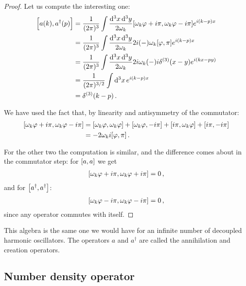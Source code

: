 \documentclass[main.tex]{subfiles}
\begin{document}
\begin{proof}
Let us compute the interesting one: 
%
\begin{align}
\qty[a(k), a ^\dag (p)] &= \frac{1}{(2\pi )^3} \int \frac{ \dd[3]{x} \dd[3]{y}}{2 \omega_{k}}
\qty[\omega_{k} \varphi + i \pi, \omega_{k} \varphi - i \pi ] e^{i(k-p)x}  \\
&= \frac{1}{(2\pi )^3} \int \frac{ \dd[3]{x} \dd[3]{y}}{2 \omega_{k}}
2 i (-) \omega_{k} \qty[ \varphi, \pi ] e^{i(k-p)x}  \\
&= \frac{1}{(2\pi )^3} \int \frac{ \dd[3]{x} \dd[3]{y}}{2 \omega_{k}}
2 i \omega_{k} (-) i \delta^{(3)} (x - y) e^{i(kx-py)}  \\
&= \frac{1}{(2\pi )^{3/2}} \int \dd[3]{x} e^{i(k-p)x}  \\
&= \delta^{(3)} (k-p) \label{eq:commutator-annihilation-creation-operators}
\,.
\end{align}

We have used the fact that, by linearity and antisymmetry of the commutator:
%
\begin{align}
\qty[\omega_{k} \varphi + i \pi, \omega_{k} \varphi - i \pi ] 
&= \qty[\omega_{k} \varphi , \omega_{k} \varphi ]+ \qty[\omega_{k} \varphi , -i \pi ] + \qty[i \pi, \omega_{k} \varphi ] + \qty[i \pi , -i \pi ]  \\
&= -2 \omega_{k} i \qty[\varphi , \pi ]
\,.
\end{align}

For the other two the computation is similar, and the difference comes about in the commutator step: for \(\qty[a, a]\) we get
%
\begin{align}
\qty[\omega_{k} \varphi + i \pi, \omega_{k} \varphi + i \pi ] = 0
\,,
\end{align}
%
and for \(\qty[a ^\dag, a ^\dag]\): 
%
\begin{align}
\qty[\omega_{k} \varphi - i \pi, \omega_{k} \varphi - i \pi ] = 0
\,,
\end{align}
%
since any operator commutes with itself.
\end{proof}

This algebra is the same one we would have for an infinite number of decoupled harmonic oscillators.  
The operators \(a\) and \(a ^\dag\) are called the annihilation and creation operators. 

\subsection{Number density operator}
\end{document}

